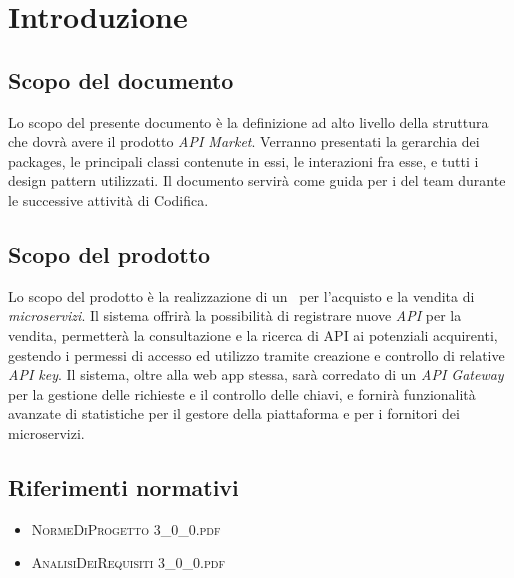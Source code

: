 \newpage
\section{Introduzione}

\subsection{Scopo del documento}
Lo scopo del presente documento è la definizione ad alto livello della struttura che dovrà avere il prodotto \textit{API Market}. Verranno presentati la gerarchia dei packages, le principali classi contenute in essi, le interazioni fra esse, e tutti i design pattern utilizzati. Il documento servirà come guida per i \textit{\Progrs} del team \textit{\gruppo} durante le successive attività di Codifica.

\subsection{Scopo del prodotto}
Lo scopo del prodotto è la realizzazione di un \progetto\ per l'acquisto e la vendita di \textit{microservizi}. Il sistema offrirà la possibilità di registrare nuove \textit{API} per la vendita, permetterà la consultazione e la ricerca di API ai potenziali acquirenti, gestendo i permessi di accesso ed utilizzo tramite creazione e controllo di relative \textit{API key}. Il sistema, oltre alla web app stessa, sarà corredato di un \textit{API Gateway} per la gestione delle richieste e il controllo delle chiavi, e fornirà funzionalità avanzate di statistiche per il gestore della piattaforma e per i fornitori dei microservizi.

\subsection{Riferimenti normativi}
\begin{itemize}
	\item \textsc{NormeDiProgetto 3\_0\_0.pdf}
	\item \textsc{AnalisiDeiRequisiti 3\_0\_0.pdf}
\end{itemize}

